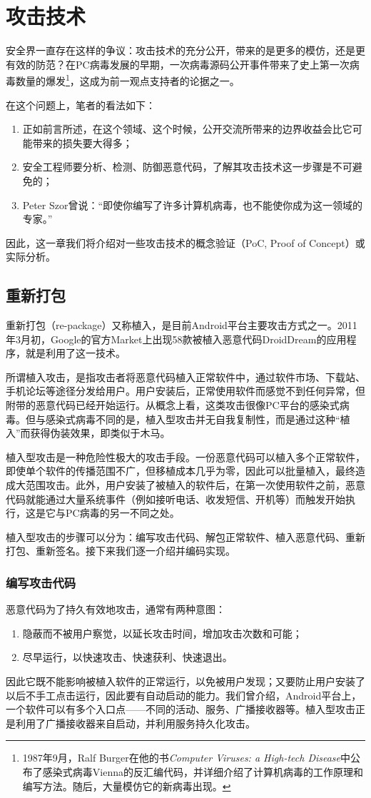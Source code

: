 \chapter{攻击技术}
安全界一直存在这样的争议：攻击技术的充分公开，带来的是更多的模仿，还是更有效的防范？在PC病毒发展的早期，一次病毒源码公开事件带来了史上第一次病毒数量的爆发\footnote{1987年9月，Ralf Burger在他的书\textit{Computer Viruses: a High-tech Disease}中公布了感染式病毒Vienna的反汇编代码，并详细介绍了计算机病毒的工作原理和编写方法。随后，大量模仿它的新病毒出现。}，这成为前一观点支持者的论据之一。

在这个问题上，笔者的看法如下：
\begin{enumerate}
  \item 正如前言所述，在这个领域、这个时候，公开交流所带来的边界收益会比它可能带来的损失要大得多；
  \item 安全工程师要分析、检测、防御恶意代码，了解其攻击技术这一步骤是不可避免的；
  \item Peter Szor曾说\cite{art_virus}：“即使你编写了许多计算机病毒，也不能使你成为这一领域的专家。”
\end{enumerate}

因此，这一章我们将介绍对一些攻击技术的概念验证（PoC, Proof of Concept）或实际分析。
\section{重新打包}
\label{Sec:repackage}
重新打包（re-package）又称植入，是目前Android平台主要攻击方式之一。2011年3月初，Google的官方Market上出现58款被植入恶意代码DroidDream的应用程序，就是利用了这一技术。

所谓植入攻击，是指攻击者将恶意代码植入正常软件中，通过软件市场、下载站、手机论坛等途径分发给用户。用户安装后，正常使用软件而感觉不到任何异常，但附带的恶意代码已经开始运行。从概念上看，这类攻击很像PC平台的感染式病毒。但与感染式病毒不同的是，植入型攻击并无自我复制性，而是通过这种“植入”而获得伪装效果，即类似于木马。

植入型攻击是一种危险性极大的攻击手段。一份恶意代码可以植入多个正常软件，即使单个软件的传播范围不广，但移植成本几乎为零，因此可以批量植入，最终造成大范围攻击。此外，用户安装了被植入的软件后，在第一次使用软件之前，恶意代码就能通过大量系统事件（例如接听电话、收发短信、开机等）而触发开始执行，这是它与PC病毒的另一不同之处。

植入型攻击的步骤可以分为：编写攻击代码、解包正常软件、植入恶意代码、重新打包、重新签名。接下来我们逐一介绍并编码实现。
\subsection{编写攻击代码}
恶意代码为了持久有效地攻击，通常有两种意图：
\begin{enumerate}
	\item 隐蔽而不被用户察觉，以延长攻击时间，增加攻击次数和可能；
	\item 尽早运行，以快速攻击、快速获利、快速退出。
\end{enumerate}
因此它既不能影响被植入软件的正常运行，以免被用户发现；又要防止用户安装了以后不手工点击运行，因此要有自动启动的能力。我们曾介绍，Android平台上，一个软件可以有多个入口点——不同的活动、服务、广播接收器等。植入型攻击正是利用了广播接收器来自启动，并利用服务持久化攻击。

